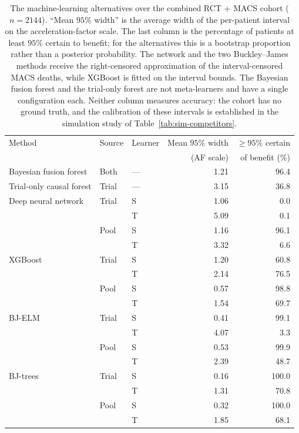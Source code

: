 \begin{table}[!tb]
  \centering
  \small
  \begin{tabular}{@{}lll rr@{}}
    \toprule
    Method & Source & Learner & Mean $95\%$ width & $\geq 95\%$ certain \\
           &        &         & (AF scale)        & of benefit (\%)     \\
    \midrule
    Bayesian fusion forest   & Both  & --- & 1.21 & 96.4 \\
    Trial-only causal forest & Trial & --- & 3.15 & 36.8 \\
    \midrule
    Deep neural network      & Trial & S & 1.06 & 0.0 \\
                             &       & T & 5.09 & 0.1 \\
                             & Pool  & S & 1.16 & 96.1 \\
                             &       & T & 3.32 & 6.6 \\
    \addlinespace
    XGBoost                  & Trial & S & 1.20 & 60.8 \\
                             &       & T & 2.14 & 76.5 \\
                             & Pool  & S & 0.57 & 98.8 \\
                             &       & T & 1.54 & 69.7 \\
    \addlinespace
    BJ-ELM                   & Trial & S & 0.41 & 99.1 \\
                             &       & T & 4.07 & 3.3 \\
                             & Pool  & S & 0.53 & 99.9 \\
                             &       & T & 2.39 & 48.7 \\
    \addlinespace
    BJ-trees                 & Trial & S & 0.16 & 100.0 \\
                             &       & T & 1.31 & 70.8 \\
                             & Pool  & S & 0.32 & 100.0 \\
                             &       & T & 1.85 & 68.1 \\
    \bottomrule
  \end{tabular}
  \caption{The machine-learning alternatives over the combined RCT + MACS
    cohort ($n = 2144$). ``Mean $95\%$ width'' is the average width of the
    per-patient interval on the acceleration-factor scale. The last column is
    the percentage of patients at least $95\%$ certain to benefit; for the
    alternatives this is a bootstrap proportion rather than a posterior
    probability. The network and the two Buckley--James methods receive the
    right-censored approximation of the interval-censored MACS deaths, while
    XGBoost is fitted on the interval bounds. The Bayesian fusion forest and the
    trial-only forest are not meta-learners and have a single configuration
    each. Neither column measures accuracy: the cohort has no ground truth, and
    the calibration of these intervals is established in the simulation study
    of Table~\ref{tab:sim-competitors}.}
  \label{tab:sm-analysis-competitors}
\end{table}

